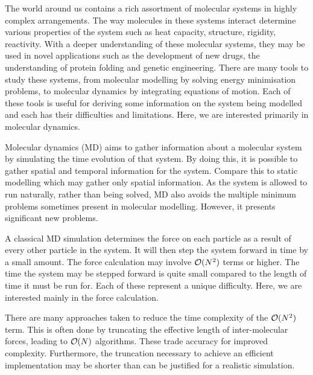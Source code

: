 %
%

%
The world around us contains
a rich assortment of molecular systems in
highly complex arrangements.
%
The way molecules in these systems interact determine various properties
of the system such as heat capacity, structure, rigidity, reactivity.
%
With a deeper understanding of these molecular systems,
they may be used in novel applications such as
the development of new drugs,
the understanding of protein folding and
genetic engineering.
%
There are many tools to study these systems,
from molecular modelling by solving energy minimisation problems,
to molecular dynamics by integrating equations of motion.
%
Each of these tools is useful for
deriving some information on the system being modelled and
each has their difficulties and limitations.
%
Here, we are interested primarily in molecular dynamics.

Molecular dynamics (MD) aims to
gather information about a molecular system by
simulating the time evolution of that system.
%
By doing this, it is possible to
gather spatial and temporal information for the system.
%
Compare this to static modelling which may gather only spatial information.
%
As the system is allowed to run naturally, rather than being solved,
MD also avoids the multiple minimum problems
sometimes present in molecular modelling.
%
However, it presents significant new problems.


%
A classical MD simulation determines
the force on each particle as a result of
every other particle in the system.
%
It will then step the system forward in time by a small amount.
%
The force calculation may involve $\mathcal{O}{(N^2)}$ terms or higher.
%
The time the system may be stepped forward is
quite small compared to the length of time it must be run for.
%
Each of these represent a unique difficulty.
%
Here, we are interested mainly in the force calculation.


There are many approaches taken to reduce the time complexity of
the $\mathcal{O}{(N^2)}$ term.
%
This is often done by truncating the effective length of inter-molecular
forces, leading to $\mathcal{O}{(N)}$ algorithms.
%
These trade accuracy for improved complexity.
%
Furthermore, the truncation necessary to achieve an efficient implementation
may be shorter than can be justified for a realistic simulation.


